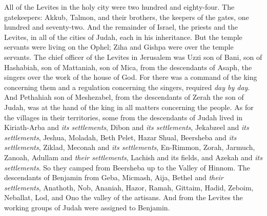 \begin{biblechapter}
\verse All of the Levites in the holy city were two hundred and eighty-four.
\verse The gatekeepers: Akkub, Talmon, and their brothers, the keepers of the gates, one hundred and seventy-two.
\verse And the remainder of Israel, the priests and the Levites, in all of the cities of Judah, each in his inheritance.
\verse But the temple servants were living on the Ophel; Ziha and Gishpa were over the temple servants.
\verse The chief officer of the Levites in Jerusalem was Uzzi son of Bani, son of Hashabiah, son of Mattaniah, son of Mica, from the descendants of Asaph, the singers over the work of the house of God.
\verse For there was a command of the king concerning them and a regulation concerning the singers, required \textit{day by day}.
\verse And Pethahiah son of Meshezabel, from the descendants of Zerah the son of Judah, was at the hand of the king in all matters concerning the people.
 As for the villages in their territories, some from the descendants of Judah lived in Kiriath-Arba and \textit{its settlements}, Dibon and \textit{its settlements}, Jekabzeel and \textit{its settlements},
\verse Jeshua, Moladah, Beth Pelet,
\verse Hazar Shual, Beersheba and \textit{its settlements},
\verse Ziklad, Meconah and \textit{its settlements},
\verse En-Rimmon, Zorah, Jarmuch,
\verse Zanoah, Adullam and \textit{their settlements}, Lachish and its fields, and Azekah and \textit{its settlements}. So they camped from Beersheba up to the Valley of Hinnom.
\verse The descendants of Benjamin from Geba, Micmash, Aija, Bethel and \textit{their settlements},
\verse Anathoth, Nob, Ananiah,
\verse Hazor, Ramah, Gittaim,
\verse Hadid, Zeboim, Neballat,
\verse Lod, and Ono the valley of the artisans.
\verse And from the Levites the working groups of Judah were assigned to Benjamin.
\end{biblechapter}

